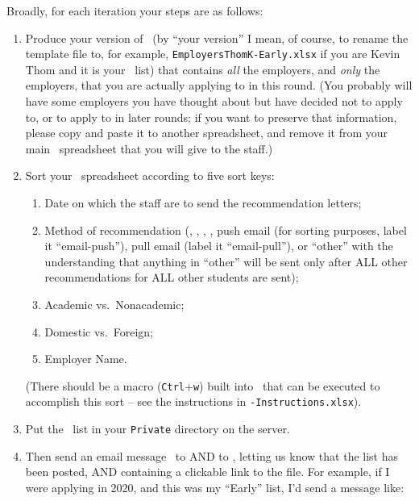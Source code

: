 \documentclass{econtex}
\newcommand\redout{\bgroup\markoverwith
{\textcolor{red}{\rule[.5ex]{2pt}{1pt}}}\ULon}
\begin{document}
Broadly, for each iteration your steps are as follows:
\begin{enumerate}
\item Produce your version of \EM~(by ``your version'' I mean, of
  course, to rename the template file to, for example,
  \texttt{EmployersThomK-Early.xlsx} if you are Kevin Thom and it is
  your \Early~list) that contains {\it all} the employers, and {\it
    only} the employers, that you are actually applying to in this
  round.  (You probably will have some employers you have thought
  about but have decided not to apply to, or to apply to in later rounds; if you want to preserve that
  information, please copy and paste it to another spreadsheet, and
  remove it from your main \EMW~spreadsheet that you will give to the
  staff.)

\item Sort your \EM~spreadsheet according to five sort keys:
 \begin{enumerate} 
 \item Date on which the staff are to send the recommendation letters; 
 \item Method of recommendation (\AEA, \AJO, \EJM, \Interfolio, push email (for sorting purposes,
  label it ``email-push''), pull email (label it ``email-pull''), or
  ``other'' with the understanding that anything in ``other'' will be
  sent only after ALL other recommendations for ALL other students are
  sent);
  \item Academic vs.\ Nonacademic;
  \item Domestic vs.\ Foreign;
  \item Employer Name. 
  \end{enumerate} 

  (There should be a macro (\texttt{Ctrl}+\texttt{w}) built into \EM~that can be
  executed to accomplish this sort -- see the instructions in
  \EM\texttt{-Instructions.xlsx}).

\item Put the {\EM}~list in your \texttt{Private} directory on the server.
  
\item Then send an email message \EM~to \JMStaffEmail AND to \JMPOEmail, letting us know that the list has been posted, AND containing a clickable link to the file.  For example, if I were applying in 2020, and this was my ``Early'' list, I'd send a message like:


\end{enumerate}
\end{document}
